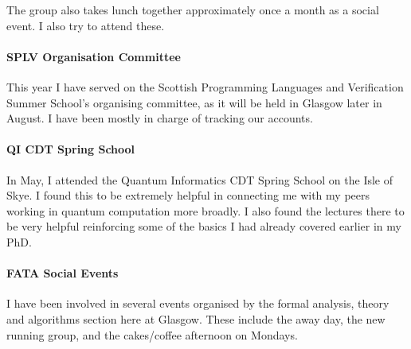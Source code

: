 The group also takes lunch together approximately once a month as a social event. 
% 
I also try to attend these.

\paragraph{SPLV Organisation Committee}
This year I have served on the Scottish Programming Languages and Verification Summer School's organising committee,
as it will be held in Glasgow later in August.
% 
I have been mostly in charge of tracking our accounts.

\paragraph{QI CDT Spring School}
In May, I attended the Quantum Informatics CDT Spring School on the Isle of Skye.
% 
I found this to be extremely helpful in connecting me with my peers working in quantum computation more broadly.
% 
I also found the lectures there to be very helpful reinforcing some of the basics I had already covered earlier in my PhD.

\paragraph{FATA Social Events}
I have been involved in several events organised by the formal analysis, theory and algorithms section here at Glasgow.
These include the away day, the new running group, and the cakes/coffee afternoon on Mondays.
